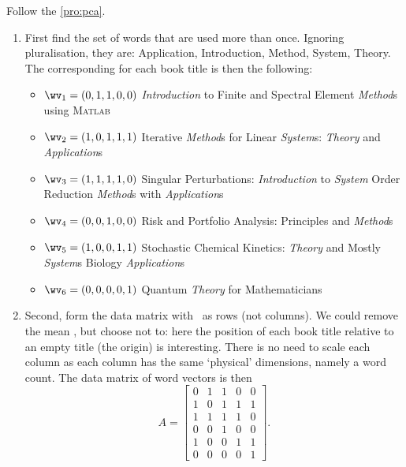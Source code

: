 
Follow the  \autoref{pro:pca}.
\begin{enumerate}
\item 
First find the set of words that are used more than once.
Ignoring pluralisation, they are: 
Application, Introduction, Method, System, Theory.
The corresponding  for each book title is then the following:
\begin{itemize}
\item \(\wv_1=(0,1,1,0,0)\) \emph{Introduction} to Finite and Spectral Element \emph{Method}s using \textsc{Matlab}
\item \(\wv_2=(1,0,1,1,1)\) Iterative \emph{Method}s for Linear \emph{System}s: \emph{Theory} and \emph{Application}s 
\item \(\wv_3=(1,1,1,1,0)\) Singular Perturbations: \emph{Introduction} to \emph{System} Order Reduction \emph{Method}s with \emph{Application}s 
\item \(\wv_4=(0,0,1,0,0)\) Risk and Portfolio Analysis: Principles and \emph{Method}s 
\item \(\wv_5=(1,0,0,1,1)\) Stochastic Chemical Kinetics: \emph{Theory} and Mostly \emph{System}s Biology \emph{Application}s
\item \(\wv_6=(0,0,0,0,1)\) Quantum \emph{Theory} for Mathematicians 
\end{itemize}

\item Second, form the data matrix with \hlist{}\ as rows (not columns).
We could remove the mean , but choose not to: here the position of each book title relative to an empty title (the origin) is interesting.
There is no need to scale each column as each column has the same `physical' dimensions, namely a word count.
The data matrix of word vectors is then
\begin{equation*}
A=\begin{bmatrix} 0&1&1&0&0
\\1&0&1&1&1
\\1&1&1&1&0
\\0&0&1&0&0
\\1&0&0&1&1
\\0&0&0&0&1 \end{bmatrix}.
\end{equation*}
\setbox\ajrqrbox\hbox{}%
\marginpar{\usebox{\ajrqrbox\\[2ex]}}%



\end{enumerate}
